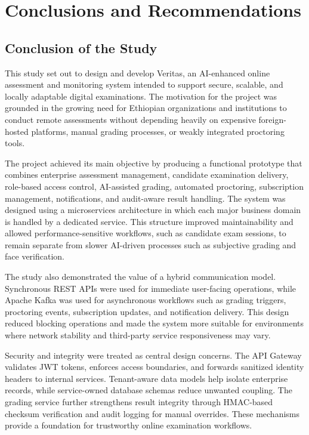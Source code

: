 \section{Conclusions and Recommendations}

\subsection{Conclusion of the Study}
This study set out to design and develop Veritas, an AI-enhanced online assessment and monitoring system intended to support secure, scalable, and locally adaptable digital examinations. The motivation for the project was grounded in the growing need for Ethiopian organizations and institutions to conduct remote assessments without depending heavily on expensive foreign-hosted platforms, manual grading processes, or weakly integrated proctoring tools.

The project achieved its main objective by producing a functional prototype that combines enterprise assessment management, candidate examination delivery, role-based access control, AI-assisted grading, automated proctoring, subscription management, notifications, and audit-aware result handling. The system was designed using a microservices architecture in which each major business domain is handled by a dedicated service. This structure improved maintainability and allowed performance-sensitive workflows, such as candidate exam sessions, to remain separate from slower AI-driven processes such as subjective grading and face verification.

The study also demonstrated the value of a hybrid communication model. Synchronous REST APIs were used for immediate user-facing operations, while Apache Kafka was used for asynchronous workflows such as grading triggers, proctoring events, subscription updates, and notification delivery. This design reduced blocking operations and made the system more suitable for environments where network stability and third-party service responsiveness may vary.

Security and integrity were treated as central design concerns. The API Gateway validates JWT tokens, enforces access boundaries, and forwards sanitized identity headers to internal services. Tenant-aware data models help isolate enterprise records, while service-owned database schemas reduce unwanted coupling. The grading service further strengthens result integrity through HMAC-based checksum verification and audit logging for manual overrides. These mechanisms provide a foundation for trustworthy online examination workflows.

